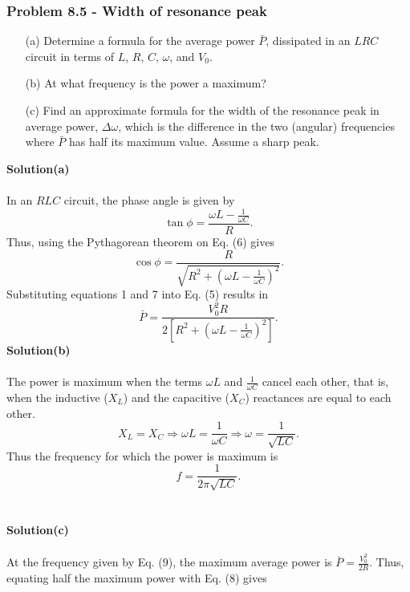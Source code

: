 \documentclass{article}
\begin{document}
\subsubsection*{Problem 8.5 - Width of resonance peak}
\begin{enumerate}
    \item[(a)]Determine a formula for the average power $\bar{P}$, dissipated in an $LRC$ circuit in terms of $L$, $R$, $C$, $\omega$, and $V_0$.
    \item[(b)]At what frequency is the power a maximum?
    \item[(c)]Find an approximate formula for the width of the resonance peak in average power, $\Delta\omega$, which is the difference in the two (angular) frequencies where $\bar{P}$ has half its maximum value. Assume a sharp peak.
\end{enumerate}
\textbf{Solution(a)}
\\
\\In an $RLC$ circuit, the phase angle is given by 
\begin{equation}
    \tan\phi=\frac{\omega L-\frac{1}{\omega C}}{R}.
\end{equation}
Thus, using the Pythagorean theorem on Eq. (6) gives
\begin{equation}
    \cos\phi=\frac{R}{\sqrt{R^2+\left(\omega L-\frac{1}{\omega C}\right)^2}}.
\end{equation}
Substituting equations 1 and 7 into Eq. (5) results in
\begin{equation}
    \bar{P}=\frac{V_0^2R}{2\left[R^2+\left(\omega L-\frac{1}{\omega C}\right)^2\right]}.
\end{equation}
\textbf{Solution(b)}
\\
\\The power is maximum when the terms $\omega L$ and $\frac{1}{\omega C}$ cancel each other, that is, when the inductive ($X_L$) and the capacitive ($X_C$) reactances are equal to each other.
\[X_L=X_C\Rightarrow\omega L=\frac{1}{\omega C}\Rightarrow\omega=\frac{1}{\sqrt{LC}}.\]
Thus the frequency for which the power is maximum is
\begin{equation}
    f=\frac{1}{2\pi\sqrt{LC}}.
\end{equation}
\\
\\
\textbf{Solution(c)}
\\
\\At the frequency given by Eq. (9), the maximum average power is $\bar{P}=\frac{V_0^2}{2R}$.
Thus, equating half the maximum power with Eq. (8) gives
\end{document}
